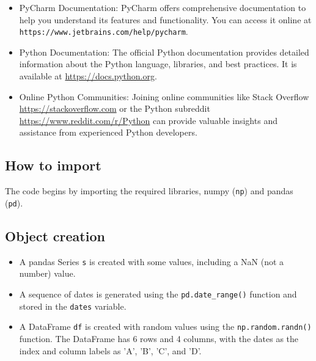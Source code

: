 \begin{itemize}
	
	\item PyCharm Documentation: PyCharm offers comprehensive documentation to help you understand its features and functionality. You can access it online at \texttt{https://www.jetbrains.com/help/pycharm}.
	
	\item Python Documentation: The official Python documentation provides detailed information about the Python language, libraries, and best practices. It is available at \url{https://docs.python.org}.
	
	\item Online Python Communities: Joining online communities like Stack Overflow \url{https://stackoverflow.com} or the Python subreddit \url{https://www.reddit.com/r/Python} can provide valuable insights and assistance from experienced Python developers.
	
\end{itemize}


\subsection{How to import}
The code begins by importing the required libraries, numpy (\texttt{np}) and pandas (\texttt{pd}).

\begin{code}[h!]
	    
	
	\caption{How to Import the package}
	
\end{code}

\subsection{Object creation}

\begin{itemize}
	\item A pandas Series \texttt{s} is created with some values, including a NaN (not a number) value.
	\item A sequence of dates is generated using the \texttt{pd.date\_range()} function and stored in the \texttt{dates} variable.
	\item A DataFrame \texttt{df} is created with random values using the \texttt{np.random.randn()} function. The DataFrame has 6 rows and 4 columns, with the dates as the index and column labels as 'A', 'B', 'C', and 'D'.
\end{itemize}

